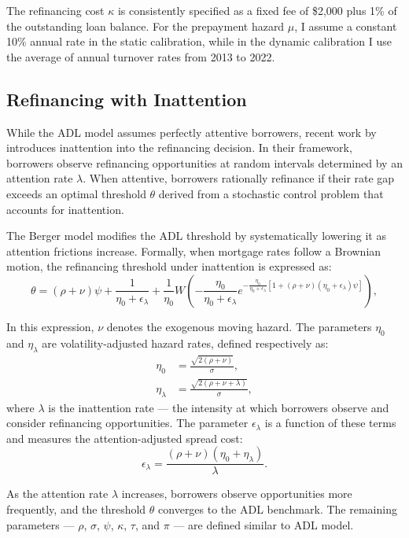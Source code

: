 \documentclass[11pt]{article}
\begin{document}
{The refinancing cost $\kappa$ is consistently specified as a fixed fee of \$2,000 plus 1\% of the outstanding loan balance. For the prepayment hazard $\mu$, I assume a constant 10\% annual rate in the static calibration, while in the dynamic calibration I use the average of annual turnover rates from 2013 to 2022.


\subsection{Refinancing with Inattention}

While the ADL model assumes perfectly attentive borrowers, recent work by \citet{berger2024optimal} introduces inattention into the refinancing decision. In their framework, borrowers observe refinancing opportunities at random intervals determined by an attention rate $\lambda$. When attentive, borrowers rationally refinance if their rate gap exceeds an optimal threshold $\theta$ derived from a stochastic control problem that accounts for inattention.

The Berger model modifies the ADL threshold by systematically lowering it as attention frictions increase. Formally, when mortgage rates follow a Brownian motion, the refinancing threshold under inattention is expressed as:
\begin{equation}
\theta = (\rho + \nu)\psi + \frac{1}{\eta_0 + \epsilon_\lambda} + \frac{1}{\eta_0} W\left(-\frac{\eta_0}{\eta_0 + \epsilon_\lambda} e^{ -\frac{\eta_0}{\eta_0 + \epsilon_\lambda} \left[ 1 + (\rho + \nu)(\eta_0 + \epsilon_\lambda) \psi \right]} \right),
\end{equation}

In this expression, $\nu$ denotes the exogenous moving hazard. The parameters $\eta_0$ and $\eta_\lambda$ are volatility-adjusted hazard rates, defined respectively as:
\begin{align*}
\eta_0 &= \frac{ \sqrt{ 2 (\rho + \nu) } }{ \sigma }, \\
\eta_\lambda &= \frac{ \sqrt{ 2 (\rho + \nu + \lambda) } }{ \sigma },
\end{align*}
where $\lambda$ is the inattention rate — the intensity at which borrowers observe and consider refinancing opportunities. The parameter $\epsilon_\lambda$ is a function of these terms and measures the attention-adjusted spread cost:
\[
\epsilon_\lambda = \frac{ (\rho + \nu)(\eta_0 + \eta_\lambda) }{ \lambda }.
\]

As the attention rate $\lambda$ increases, borrowers observe opportunities more frequently, and the threshold $\theta$ converges to the ADL benchmark. The remaining parameters — $\rho$, $\sigma$, $\psi$, $\kappa$, $\tau$, and $\pi$ — are defined similar to ADL model.


}
\end{document}
